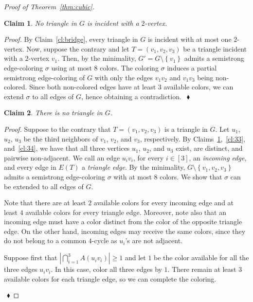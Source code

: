 \documentclass[12pt,a4paper]{article}
\newtheorem{claim}{Claim}
\newcommand{\set}[1]{\ensuremath{\left\{#1 \right\}}}
\newcommand{\F}[1]{\ensuremath{A(#1)}}
\newenvironment{proofclaim}[1][]%
    {\noindent \emph{Proof.} {}{#1}{}}{$~$\hfill $~\blacklozenge$ \vspace{0.2cm}}
\begin{document}
\begin{proof}[Proof of Theorem~\ref{thm:cubic}]
	\begin{claim}
		\label{cl:3no2v}
		No triangle in $G$ is incident with a $2$-vertex.
	\end{claim}
	
	\begin{proofclaim}
		By Claim~\ref{cl:bridge}, every triangle in $G$ is incident with at most one $2$-vertex.
		Now, suppose the contrary and let $T=(v_1,v_2,v_3)$ be a triangle incident with a $2$-vertex $v_1$.
		Then, by the minimality, $G' = G \setminus \set{v_1}$ admits a semistrong edge-coloring $\sigma$ using at most $8$ colors.
		The coloring $\sigma$ induces a partial semistrong edge-coloring of $G$ with only the edges $v_1v_2$ and $v_1v_3$ being non-colored.
		Since both non-colored edges have at least $3$ available colors, we can extend $\sigma$ to all edges of $G$,
		hence obtaining a contradiction.
	\end{proofclaim}


	\begin{claim}
		\label{cl:3}
		There is no triangle in $G$.
	\end{claim}
	
	\begin{proofclaim}
		Suppose to the contrary that $T=(v_1,v_2,v_3)$ is a triangle in $G$. 
		Let $u_1$, $u_2$, $u_3$ be the third neighbors of $v_1$, $v_2$, and $v_3$, respectively. 
		By Claims~\ref{cl:3no2v},~\ref{cl:33}, and~\ref{cl:34}, 
		we have that all three vertices $u_1$, $u_2$, and $u_3$ exist, are distinct, and pairwise non-adjacent.
		We call an edge $u_iv_i$, for every $i \in [3]$, an \textit{incoming edge},
		and every edge in $E(T)$ a \textit{triangle edge}.
		By the minimality, $G \setminus \set{v_1,v_2,v_3}$ admits a semistrong edge-coloring $\sigma$ with at most $8$ colors. 
		We show that $\sigma$ can be extended to all edges of $G$.
		
		Note that there are at least $2$ available colors for every incoming edge and at least $4$ available colors for every triangle edge. 		
		Moreover, note also that an incoming edge must have a color distinct from the color of the opposite triangle edge.
		On the other hand, incoming edges may receive the same colors, since they do not belong to a common $4$-cycle as $u_i$'s are not adjacent.
		
		Suppose first that $|\bigcap_{i=1}^3 \F{u_iv_i}| \ge 1$ and let $1$ be the color available for all the three edges $u_iv_i$. 
		In this case, color all three edges by $1$. There remain at least $3$ available colors for each triangle edge,
		so we can complete the coloring.
		

\end{proofclaim}
\end{proof}
\end{document}
